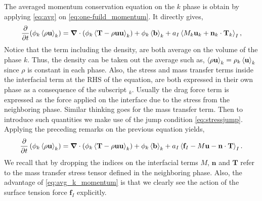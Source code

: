 The averaged momentum conservation equation on the $k$ phase is obtain by applying 
\ref{eq:avg} on \ref{eq:one-fuild_momentum}. 
It directly gives, 
\begin{equation}
    \frac{\partial}{\partial t} (\phi_k\left<\rho\textbf{u}\right>_k) 
    = \bm{\nabla}\cdot\left(
        \phi_k \left<\textbf{T}
        - \rho\textbf{uu}\right>_k
    \right)
    +\phi_k\left<\textbf{b}\right>_k
    + a_I\left<M_k \textbf{u}_k +\textbf{n}_k\cdot\textbf{T}_k\right>_I,
\end{equation}
Notice that the term including the density, are both average on the volume of the phase $k$.
Thus, the density can be taken out the average such as, $\left<\rho \textbf{u}\right>_k = \rho_k\left<\textbf{u}\right>_k$ since $\rho$ is constant in each phase. 
Also, the stress and mass transfer terms inside the interfacial term at the RHS of the equation, are both expressed in their own phase as a consequence of the subscript $_k$.
Usually the drag force term is expressed as the force applied on the interface due to the stress from the neighboring phase. 
Similar thinking goes for the mass transfer term. 
Then to introduce such quantities we make use of the jump condition \ref{eq:stressjump}. 
Applying the preceding remarks on the previous equation yields,
\begin{equation}
    \frac{\partial}{\partial t} \left(
        \phi_k\left<\rho\textbf{u}\right>_k
    \right)
    = \bm{\nabla}\cdot\left(
        \phi_k \left<
            \textbf{T}
            -\rho \textbf{uu}\right>_k
    \right)
    +\phi_k\left<\textbf{b}\right>_k
    + a_I\left<
        \textbf{f}_I 
        - M \textbf{u} 
        - \textbf{n}\cdot\textbf{T}
    \right>_I.
    \label{eq:avg_k_momentum}
\end{equation}
We recall that by dropping the indices on the interfacial terms $M$, $\textbf{n}$ and $\textbf{T}$ refer to the mass transfer stress tensor defined in the neighboring phase. 
Also, the advantage of \ref{eq:avg_k_momentum} is that we clearly see the action of the surface tension force $\textbf{f}_I$ explicitly.

